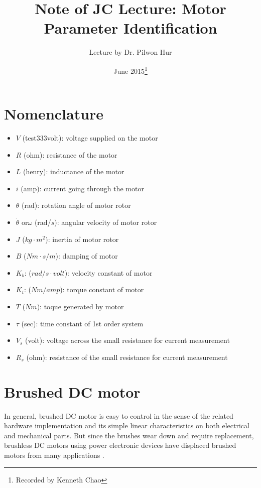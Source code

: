 \documentclass{article}
\title{Note of JC Lecture: Motor Parameter Identification}
\author{Lecture by Dr. Pilwon Hur}
\date{June 2015\footnote{Recorded by Kenneth Chao}}
\begin{document}
\maketitle

\section*{Nomenclature}
\begin{itemize}
\item[] $V$ (test333volt): voltage supplied on the motor
\item[] $R$ (ohm): resistance of the motor
\item[] $L$ (henry): inductance of the motor
\item[] $i$ (amp): current going through the motor
\item[] $\theta$ (rad): rotation angle of motor rotor
\item[] $\dot\theta$ or$\omega$ (rad/$s$): angular velocity of motor rotor
\item[] $J$ ($kg\cdot m^2$): inertia of motor rotor
\item[] $B$ ($Nm\cdot s/m$): damping of motor
\item[] $K_b$: ($rad/s\cdot volt$): velocity constant of motor
\item[] $K_t$: ($Nm/amp$): torque constant of motor
\item[] $T$ ($Nm$): toque generated by motor
\item[] $\tau$ (sec): time constant of 1st order system
\item[] $V_s$ (volt): voltage across the small resistance for current measurement
\item[] $R_s$ (ohm): resistance of the small resistance for current measurement
\end{itemize}
\section{Brushed DC motor}
In general, brushed DC motor is easy to control in the sense of the related hardware implementation and its simple linear characteristics on both electrical and mechanical parts. But since the brushes wear down and require replacement, brushless DC motors using power electronic devices have displaced brushed motors from many applications \cite{WikiDCM}.
\end{document}
